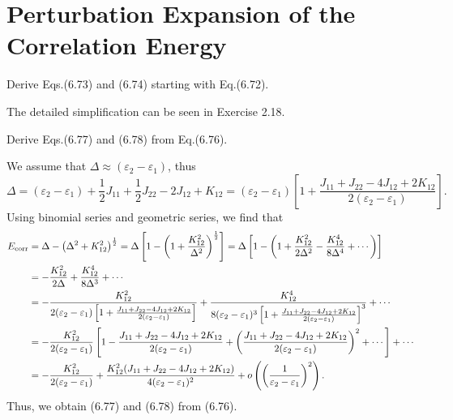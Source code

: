 \documentclass[a4paper]{book}
\newcounter{exercise}[chapter]
\newcounter{solution}[chapter]
\newcommand{\corr}{{\rm corr}}
\begin{document}
	\section{Perturbation Expansion of the Correlation Energy}
	
	\begin{exercise}
	Derive Eqs.(6.73) and (6.74) starting with Eq.(6.72).
	\end{exercise}
	
	\begin{solution}

	The detailed simplification can be seen in Exercise 2.18.
	
	\end{solution}
	
	\begin{exercise}
	Derive Eqs.(6.77) and (6.78) from Eq.(6.76).
	\end{exercise}
	
	\begin{solution}
	We assume that $\Delta \approx (\varepsilon_2 - \varepsilon_1)$, thus	
	\[
		\Delta = ( \varepsilon_2 - \varepsilon_1 ) + \frac{1}{2} J_{11} + \frac{1}{2} J_{22} - 2 J_{12} + K_{12} = ( \varepsilon_2 - \varepsilon_1 ) \left[ 1 + \frac{ J_{11} + J_{22} - 4 J_{12} + 2 K_{12} }{ 2 ( \varepsilon_2 - \varepsilon_1 ) } \right].
	\]
	Using binomial series and geometric series, we find that
	\begin{align*}
		E_\corr &= \Delta - \left( \Delta^2 + K^2_{12} \right)^{\frac{1}{2}} = \Delta \left[ 1 - \left( 1 + \frac{ K^2_{12} }{ \Delta^2 } \right)^{\frac{1}{2}} \right] = \Delta \left[ 1 - \left( 1 + \frac{ K^2_{12} }{ 2\Delta^2 } - \frac{ K^4_{12} }{ 8\Delta^4 } + \cdots \right) \right] \\
		&= - \frac{ K^2_{12} }{ 2\Delta } + \frac{ K^4_{12} }{ 8\Delta^3 } + \cdots \\
		&= - \frac{ K^2_{12} }{ 2( \varepsilon_2 - \varepsilon_1 ) \left[ 1 + \frac{ J_{11} + J_{22} - 4 J_{12} + 2 K_{12} }{ 2 ( \varepsilon_2 - \varepsilon_1 ) } \right] } + \frac{ K^4_{12} }{ 8 ( \varepsilon_2 - \varepsilon_1 )^3 \left[ 1 + \frac{ J_{11} + J_{22} - 4 J_{12} + 2 K_{12} }{ 2 ( \varepsilon_2 - \varepsilon_1 ) } \right]^3 } + \cdots \\
		&= - \frac{ K^2_{12} }{ 2( \varepsilon_2 - \varepsilon_1 )} \left[ 1 - \frac{ J_{11} + J_{22} - 4 J_{12} + 2 K_{12} }{ 2 ( \varepsilon_2 - \varepsilon_1 ) } + \left( \frac{ J_{11} + J_{22} - 4 J_{12} + 2 K_{12} }{ 2 ( \varepsilon_2 - \varepsilon_1 ) } \right)^2 + \cdots \right] + \cdots \\
		&= - \frac{ K^2_{12} }{ 2( \varepsilon_2 - \varepsilon_1 )} + \frac{ K^2_{12} ( J_{11} + J_{22} - 4 J_{12} + 2 K_{12} ) }{ 4( \varepsilon_2 - \varepsilon_1 )^2 } + o\left( \left( \frac{1}{ \varepsilon_2 - \varepsilon_1 } \right)^2 \right) .
	\end{align*}
	Thus, we obtain (6.77) and (6.78) from (6.76).
	
	\end{solution}
	
\end{document}
